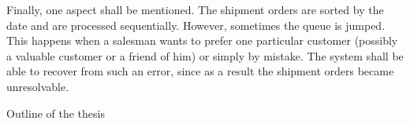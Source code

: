Finally, one aspect shall be mentioned. The shipment orders are sorted by the date and are processed sequentially. However, sometimes the queue is jumped. This happens when a salesman wants 
to prefer one particular customer (possibly a valuable customer or a friend of him) or simply by mistake. The system shall be able to recover from such an error, since as a result the shipment 
orders became unresolvable.

\sec Outline of the thesis

